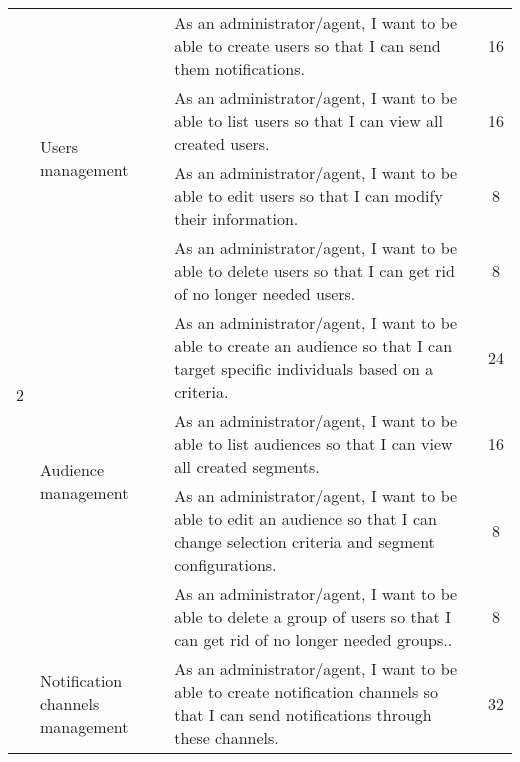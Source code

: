 \begin{longtable}{ | m{}  | m{} | m{} | c | }
                            & \multirow{4}{5em}{Users management}                 & As an administrator/agent, I want to be able to create users so that I can send them notifications.                                   & 16                  \\
    \cline{3-4}
                            &                                                     & As an administrator/agent, I want to be able to list users so that I can view all created users.                                      & 16                  \\
    \cline{3-4}
                            &                                                     & As an administrator/agent, I want to be able to edit users so that I can modify their information.                                    & 8                   \\
    \cline{3-4}
                            &                                                     & As an administrator/agent, I want to be able to delete users so that I can get rid of no longer needed users.                         & 8                   \\
    \hline
    \multirow[t]{2}{5em}{2} & \multirow{4}{5em}{Audience management}              & As an administrator/agent, I want to be able to create an audience so that I can target specific individuals based on a criteria.     & 24                  \\
    \cline{3-4}
                            &                                                     & As an administrator/agent, I want to be able to list audiences so that I can view all created segments.                               & 16                  \\
    \cline{3-4}
                            &                                                     & As an administrator/agent, I want to be able to edit an audience so that I can change selection criteria and segment configurations.  & 8                   \\
    \cline{3-4}
                            &                                                     & As an administrator/agent, I want to be able to delete a group of users so that I can get rid of no longer needed groups..            & 8                   \\
    \cline{2-4}
                            & \multirow{4}{5em}{Notification channels management} & As an administrator/agent, I want to be able to create notification channels so that I can send notifications through these channels. & 32                  \\

\end{longtable}
